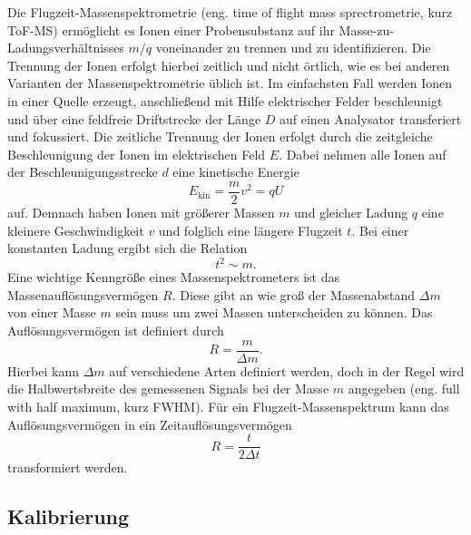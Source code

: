 \documentclass[numbers=noenddot,a4paper,notitlepage,twoside,BCOR15mm]{scrartcl}
\begin{document}
		Die Flugzeit-Massenspektrometrie (eng. time of flight mass sprectrometrie, kurz ToF-MS) ermöglicht es Ionen einer Probensubstanz auf ihr Masse-zu-Ladungsverhältnisses $m/q$ voneinander zu trennen und zu identifizieren. Die Trennung der Ionen erfolgt hierbei zeitlich und nicht örtlich, wie es bei anderen Varianten der Massenspektrometrie üblich ist. Im einfachsten Fall werden Ionen in einer Quelle erzeugt, anschließend mit Hilfe elektrischer Felder beschleunigt und über eine feldfreie Driftstrecke der Länge $D$ auf einen Analysator transferiert und fokussiert. Die zeitliche Trennung der Ionen erfolgt durch die zeitgleiche Beschleunigung der Ionen im elektrischen Feld $E$. Dabei nehmen alle Ionen auf der Beschleunigungsstrecke $d$ eine kinetische Energie 
		\begin{equation}
			E_\mathrm{kin}= \frac{m}{2}v^2 = qU
		\end{equation}
		auf. Demnach haben Ionen mit größerer Massen $m$ und gleicher Ladung $q$ eine kleinere Geschwindigkeit $v$ und folglich eine längere Flugzeit $t$. Bei einer konstanten Ladung ergibt sich die Relation
		\begin{equation}
		\label{eq:ToF_rel}
			t^2 \sim m.
		\end{equation}
		Eine wichtige Kenngröße eines Massenspektrometers ist das Massenauflösungsvermögen $R$. Diese gibt an wie groß der Massenabstand $\Delta m$ von einer Masse $m$ sein muss um zwei Massen unterscheiden zu können. Das Auflösungsvermögen ist definiert durch
		\begin{equation}
			R = \frac{m}{\Delta m}.
		\end{equation}
		Hierbei kann $\Delta m$ auf verschiedene Arten definiert werden, doch in der Regel wird die Halbwertsbreite des gemessenen Signals bei der Masse $m$ angegeben (eng. full with half maximum, kurz FWHM). Für ein Flugzeit-Massenspektrum kann das Auflösungsvermögen in ein Zeitauflösungsvermögen
		\begin{equation}
			R  = \frac{t}{2 \Delta t}
		\end{equation}
		transformiert werden.
		
		\subsection{Kalibrierung}
		
\end{document}
